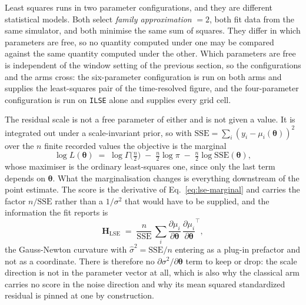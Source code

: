 Least squares runs in two parameter configurations, and they are different statistical
models. Both select \emph{family approximation} $= 2$, both fit data from the same
simulator, and both minimise the same sum of squares. They differ in which parameters
are free, so no quantity computed under one may be compared against the same quantity
computed under the other. Which parameters are free is independent of the window setting
of the previous section, so the configurations and the arms cross: the six-parameter
configuration is run on both arms and supplies the least-squares pair of the time-resolved figure, and the four-parameter configuration is run on \texttt{ILSE} alone
and supplies every grid cell.

The residual scale is not a free parameter of either and is not given a value. It is
integrated out under a scale-invariant prior, so with $\mathrm{SSE}=\sum_i (y_i-\mu_i(\boldsymbol{\theta}))^2$
over the $n$ finite recorded values the objective is the marginal
\begin{equation}
  \log L(\boldsymbol{\theta}) \;=\; \log\Gamma\!\bigl(\tfrac{n}{2}\bigr)
    \;-\; \tfrac{n}{2}\log\pi \;-\; \tfrac{n}{2}\log \mathrm{SSE}(\boldsymbol{\theta}),
  \label{eq:lse-marginal}
\end{equation}
whose maximiser is the ordinary least-squares one, since only the last term depends on
$\boldsymbol{\theta}$. What the marginalisation changes is everything downstream of the point
estimate. The score is the derivative of Eq.~\ref{eq:lse-marginal} and carries the factor
$n/\mathrm{SSE}$ rather than a $1/\sigma^2$ that would have to be supplied, and the
information the fit reports is
\begin{equation}
  \mathbf{H}_{\mathrm{LSE}} \;=\; \frac{n}{\mathrm{SSE}}\,
    \sum_i \frac{\partial\mu_i}{\partial\boldsymbol{\theta}}\,
           \frac{\partial\mu_i}{\partial\boldsymbol{\theta}}^{\!\top},
  \label{eq:lse-fisher}
\end{equation}
the Gauss-Newton curvature with $\hat\sigma^2=\mathrm{SSE}/n$ entering as a plug-in
prefactor and not as a coordinate. There is therefore no $\partial\sigma^2/\partial\boldsymbol{\theta}$
term to keep or drop: the scale direction is not in the parameter vector at all, which is
also why the classical arm carries no score in the noise direction and why its mean squared
standardized residual is pinned at one by construction.
